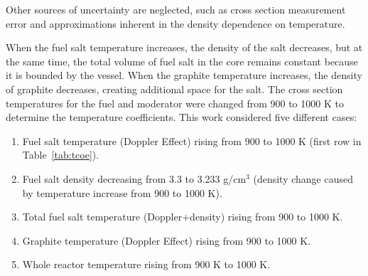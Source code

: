 Other sources of uncertainty are neglected, such as cross section measurement 
error and approximations inherent in the density dependence on temperature. 

When the fuel salt temperature increases, the density of the salt decreases, 
but at the same time, the total volume of fuel salt in the 
core remains constant because it
is bounded by the vessel. When the graphite 
temperature increases, the density of
graphite decreases, creating additional 
space for the salt. The cross section temperatures for the fuel and moderator 
were changed from 900 to 1000 K to determine the temperature coefficients. 
This work considered five different cases:
\begin{enumerate}
	\item Fuel salt temperature (Doppler Effect) rising from 900 to 1000 K 	
	(first row in Table~\ref{tab:tcoe}).
	\item Fuel salt density decreasing from 3.3 to 3.233 g/cm$^3$ 
	(density change caused by temperature increase from	900 to 1000 K).
	\item Total fuel salt temperature (Doppler+density) rising from 900 to 
	1000 K.	
	\item Graphite temperature (Doppler Effect) rising from 900 to 1000 K.
	\item Whole reactor temperature rising from 900 K to 1000 K.
\end{enumerate}

